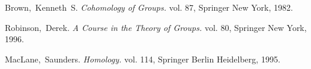
\begin{thebibliography}{99}


Brown,~Kenneth~S. \textit{Cohomology of Groups.} vol. 87, Springer New York, 1982.

Robinson,~Derek. \textit{A Course in the Theory of Groups.} vol. 80, Springer New York, 1996.

MacLane,~Saunders. \textit{Homology.} vol. 114, Springer Berlin Heidelberg, 1995.

\end{thebibliography} 